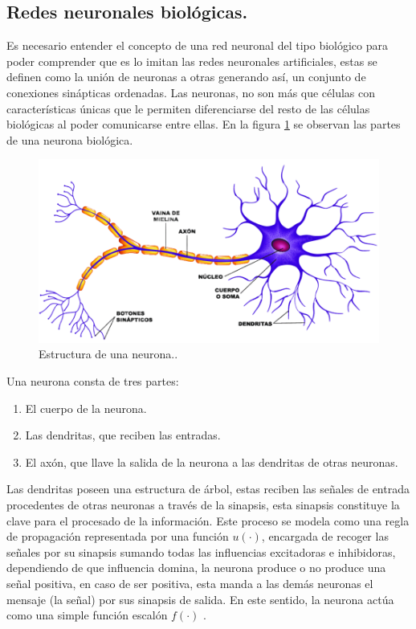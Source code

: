 \documentclass[12pt,letterpaper,oneside,openright]{book}
\begin{document}
	\subsection{Redes neuronales biológicas.}
	Es necesario entender el concepto de una red neuronal del tipo biológico para poder comprender que es lo imitan las redes neuronales artificiales, estas se definen como la unión de neuronas a otras generando así, un conjunto de conexiones sinápticas ordenadas. Las neuronas, no son más que células con características únicas que le permiten diferenciarse del resto de las células biológicas al poder comunicarse entre ellas. En la figura \ref{fig:neurona} se observan las partes de una neurona biológica. 
	\begin{figure}[h]
		\centering
		\includegraphics[width=0.6\linewidth]{Sem_1/figuras/neurona}
		\caption{Estructura de una neurona.\cite{imaNeu}.}
		\label{fig:neurona}
	\end{figure}
	
	Una neurona consta de tres partes:
	\begin{enumerate}
		\item El cuerpo de la neurona.
		\item Las dendritas, que reciben las entradas.
		\item El axón, que llave la salida de la neurona a las dendritas de otras neuronas.
	\end{enumerate} 
	Las dendritas poseen una estructura de árbol, estas reciben las señales de entrada procedentes de otras neuronas a través de la sinapsis, esta sinapsis constituye la clave para el procesado de la información. Este proceso se modela como una regla de propagación representada por una función $u(\cdot)$, encargada de recoger las señales por su sinapsis sumando todas las influencias excitadoras e inhibidoras, dependiendo de que influencia domina, la neurona produce o no produce una señal positiva, en caso de ser positiva, esta manda a las demás neuronas el mensaje (la señal) por sus sinapsis de salida. En este sentido, la neurona actúa como una simple función escalón $f(\cdot)$ \cite{nnApli}.
	
\end{document}
